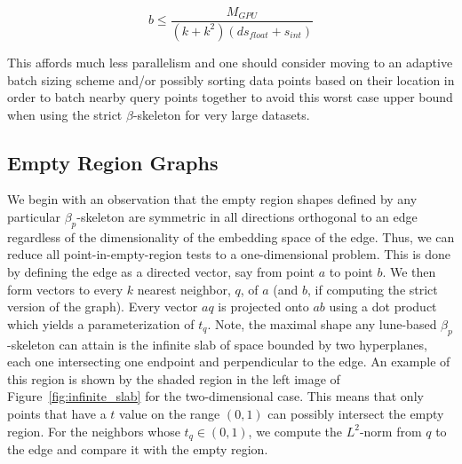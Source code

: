 \begin{equation}
    b \leq \frac{M_{GPU}}{(k+k^2)\left(ds_{float} + s_{int}\right)}
\end{equation}

This affords much less parallelism and one should consider moving to an adaptive batch sizing scheme and/or possibly sorting data points based on their location in order to batch nearby query points together to avoid this worst case upper bound when using the strict $\beta$-skeleton for very large datasets.
%


\subsection{Empty Region Graphs}
We begin with an observation that the empty region shapes defined by any particular $\beta_p$-skeleton are symmetric in all directions orthogonal to an edge regardless of the dimensionality of the embedding space of the edge.
%
Thus, we can reduce all point-in-empty-region tests to a one-dimensional problem.
%
This is done by defining the edge as a directed vector, say from point $a$ to point $b$.
%
We then form vectors to every $k$ nearest neighbor, $q$, of $a$ (and $b$, if computing the strict version of the graph).
%
Every vector $aq$ is projected onto $ab$ using a dot product which yields a parameterization of $t_q$.
%
Note, the maximal shape any lune-based $\beta_p$-skeleton can attain is the infinite slab of space bounded by two hyperplanes, each one intersecting one endpoint and perpendicular to the edge.
%
An example of this region is shown by the shaded region in the left image of Figure~\ref{fig:infinite_slab} for the two-dimensional case.
%
This means that only points that have a $t$ value on the range $(0,1)$ can possibly intersect the empty region.
%
For the neighbors whose $t_q \in (0,1)$, we compute the $L^2$-norm from $q$ to the edge and compare it with the empty region.

